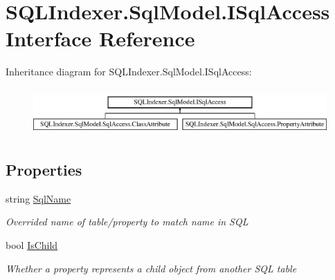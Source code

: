 \hypertarget{interface_s_q_l_indexer_1_1_sql_model_1_1_i_sql_access}{\section{S\-Q\-L\-Indexer.\-Sql\-Model.\-I\-Sql\-Access Interface Reference}
\label{interface_s_q_l_indexer_1_1_sql_model_1_1_i_sql_access}
}
Inheritance diagram for S\-Q\-L\-Indexer.\-Sql\-Model.\-I\-Sql\-Access\-:\begin{figure}[H]
\begin{center}
\leavevmode
\includegraphics[height=1.830065cm]{interface_s_q_l_indexer_1_1_sql_model_1_1_i_sql_access}
\end{center}
\end{figure}
\subsection*{Properties}
\begin{DoxyCompactItemize}
\item 
string \hyperlink{interface_s_q_l_indexer_1_1_sql_model_1_1_i_sql_access_ae5ddc708136593649ec331138a1aefea}{Sql\-Name}
\begin{DoxyCompactList}\small\item\em Overrided name of table/property to match name in S\-Q\-L \end{DoxyCompactList}\item 
bool \hyperlink{interface_s_q_l_indexer_1_1_sql_model_1_1_i_sql_access_a84a951b6e5f0f96bffba9fc5bf9c134c}{Is\-Child}
\begin{DoxyCompactList}\small\item\em Whether a property represents a child object from another S\-Q\-L table \end{DoxyCompactList}\end{DoxyCompactItemize}


